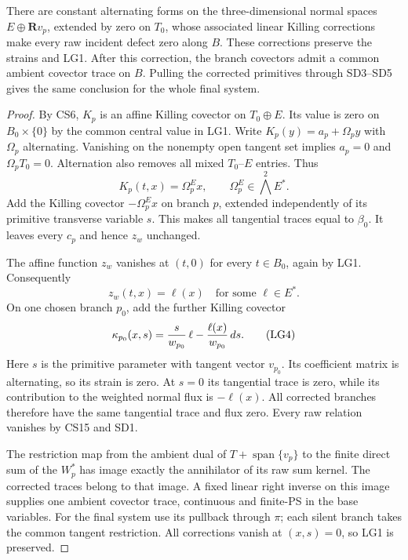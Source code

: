 \begin{theorem}
\label{thm:r13-lg-normalized-angular-gauge}
There are constant alternating forms on the three-dimensional
normal spaces $E\oplus\mathbf Rv_p$, extended by zero on
$T_0$, whose associated linear Killing corrections make every
raw incident defect zero along $B$.  These corrections preserve
the strains and LG1.  After this correction, the branch
covectors admit a common ambient covector trace on $B$.
Pulling the corrected primitives through SD3--SD5 gives the same
conclusion for the whole final system.
\end{theorem}

\begin{proof}
By CS6, $K_p$ is an affine Killing covector on $T_0\oplus E$.
Its value is zero on $B_0\times\{0\}$ by the common central
value in LG1.  Write
$K_p(y)=a_p+\Omega_py$ with $\Omega_p$ alternating.  Vanishing
on the nonempty open tangent set implies $a_p=0$ and
$\Omega_pT_0=0$.  Alternation also removes all mixed
$T_0$--$E$ entries.  Thus
\[
              K_p(t,x)=\Omega_p^E x,
                   \qquad \Omega_p^E\in\bigwedge^2E^*.
 \tag{LG2}
\]
Add the Killing covector $-\Omega_p^E x$ on branch $p$,
extended independently of its primitive transverse variable
$s$.  This makes all tangential traces equal to $\beta_0$.
It leaves every $c_p$ and hence $z_w$ unchanged.

The affine function $z_w$ vanishes at $(t,0)$ for every
$t\in B_0$, again by LG1.  Consequently
\[
                              z_w(t,x)=\ell(x)
                         \quad\text{for some }\ell\in E^*.
 \tag{LG3}
\]
On one chosen branch $p_0$, add the further Killing covector
\[
       \kappa_{p_0}(x,s)
           ={s\over w_{p_0}}\,\ell
                  -{\ell(x)\over w_{p_0}}\,ds.
 \tag{LG4}
\]
Here $s$ is the primitive parameter with tangent vector $v_{p_0}$.
Its coefficient matrix is alternating, so its strain is zero.
At $s=0$ its tangential trace is zero, while its contribution to
the weighted normal flux is $-\ell(x)$.  All corrected branches
therefore have the same tangential trace and flux zero.  Every
raw relation vanishes by CS15 and SD1.

The restriction map from the ambient dual of
$T+\operatorname{span}\{v_p\}$ to the finite direct sum of the
$W_p^*$ has image exactly the annihilator of its raw sum kernel.
The corrected traces belong to that image.  A fixed linear
right inverse on this image supplies one ambient covector trace,
continuous and finite-PS in the base variables.  For the final
system use its pullback through $\pi$; each silent branch takes
the common tangent restriction.  All corrections vanish at
$(x,s)=0$, so LG1 is preserved.
\end{proof}

